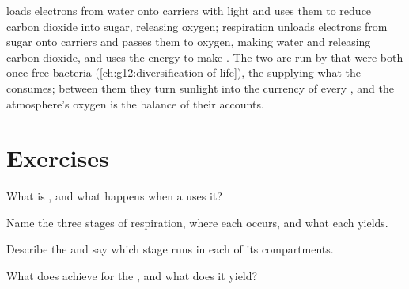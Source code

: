 \begin{remark}\label{rem:g12:respiration-fermentation:mirror}
 loads electrons from water onto carriers with light and
uses them to reduce carbon dioxide into sugar, releasing oxygen;
respiration unloads electrons from sugar onto carriers and passes
them to oxygen, making water and releasing carbon dioxide, and uses
the energy to make . The two are run by  that were both
once free bacteria (\cref{ch:g12:diversification-of-life}), the
 supplying what the  consumes; between them
they turn sunlight into the currency of every , and the
atmosphere's oxygen is the balance of their accounts.
\end{remark}

\section{Exercises}

\begin{exercise}[$\star$]\label{exo:g12:respiration-fermentation:1}
What is , and what happens when a  uses it?
\end{exercise}

\begin{exercise}[$\star$]\label{exo:g12:respiration-fermentation:2}
Name the three stages of respiration, where each occurs, and what each
yields.
\end{exercise}

\begin{exercise}[$\star$]\label{exo:g12:respiration-fermentation:3}
Describe the  and say which stage runs in each of its
compartments.
\end{exercise}

\begin{exercise}[$\star$]\label{exo:g12:respiration-fermentation:4}
What does  achieve for the , and what does it yield?
\end{exercise}

